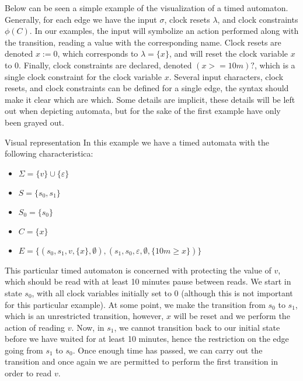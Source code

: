 Below can be seen a simple example of the visualization of a timed automaton.
Generally, for each edge we have the input $\sigma$, clock resets $\lambda$, and clock constraints $\phi(C)$.
In our examples, the input will symbolize an action performed along with the transition, reading a value with the corresponding name.
Clock resets are denoted $x := 0$, which corresponds to $\lambda = \{ x \}$, and will reset the clock variable $x$ to 0.
Finally, clock constraints are declared, denoted $(x >= 10m)?$, which is a single clock constraint for the clock variable $x$.
Several input characters, clock resets, and clock constraints can be defined for a single edge, the syntax should make it clear which are which.
Some details are implicit, these details will be left out when depicting automata, but for the sake of the first example have only been grayed out.

\begin{example}{Visual representation}
In this example we have a timed automata with the following characteristica:
\begin{itemize}
  \item $\Sigma = \{ v \} \cup \{ \varepsilon \}$
  \item $S = \{ s_0, s_1 \}$
  \item $S_0 = \{ s_0 \}$
  \item $C = \{ x \}$
  \item $E = \{ (s_0, s_1, v, \{ x \}, \emptyset), (s_1, s_0, \varepsilon, \emptyset, \{ 10m \geq x \})\}$
\end{itemize}
This particular timed automaton is concerned with protecting the value of $v$, which should be read with at least 10 minutes pause between reads.
We start in state $s_0$, with all clock variables initially set to $0$ (although this is not important for this particular example).
At some point, we make the transition from $s_0$ to $s_1$, which is an unrestricted transition, however, $x$ will be reset and we perform the action of reading $v$.
Now, in $s_1$, we cannot transition back to our initial state before we have waited for at least 10 minutes, hence the restriction on the edge going from $s_1$ to $s_0$.
Once enough time has passed, we can carry out the transition and once again we are permitted to perform the first transition in order to read $v$.

\begin{centering}

\end{centering}
\end{example}
